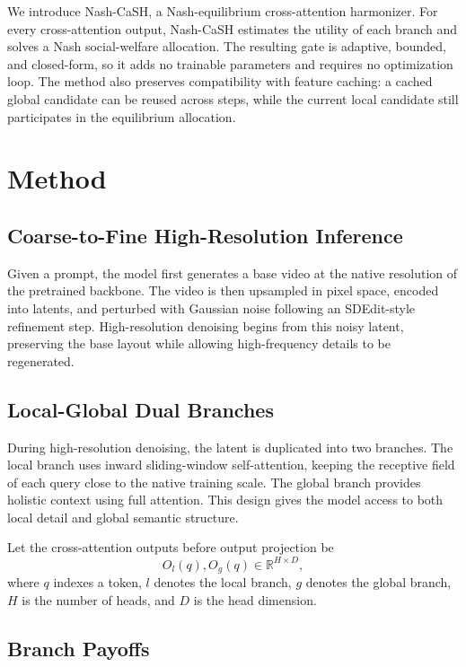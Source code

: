We introduce Nash-CaSH, a Nash-equilibrium cross-attention harmonizer.
For every cross-attention output, Nash-CaSH estimates the utility of each branch and solves a Nash social-welfare allocation.
The resulting gate is adaptive, bounded, and closed-form, so it adds no trainable parameters and requires no optimization loop.
The method also preserves compatibility with feature caching: a cached global candidate can be reused across steps, while the current local candidate still participates in the equilibrium allocation.

\section{Method}

\subsection{Coarse-to-Fine High-Resolution Inference}

Given a prompt, the model first generates a base video at the native resolution of the pretrained backbone.
The video is then upsampled in pixel space, encoded into latents, and perturbed with Gaussian noise following an SDEdit-style refinement step.
High-resolution denoising begins from this noisy latent, preserving the base layout while allowing high-frequency details to be regenerated.

\subsection{Local-Global Dual Branches}

During high-resolution denoising, the latent is duplicated into two branches.
The local branch uses inward sliding-window self-attention, keeping the receptive field of each query close to the native training scale.
The global branch provides holistic context using full attention.
This design gives the model access to both local detail and global semantic structure.

Let the cross-attention outputs before output projection be
\begin{equation}
O_l(q), O_g(q) \in \mathbb{R}^{H \times D},
\end{equation}
where $q$ indexes a token, $l$ denotes the local branch, $g$ denotes the global branch, $H$ is the number of heads, and $D$ is the head dimension.

\subsection{Branch Payoffs}

